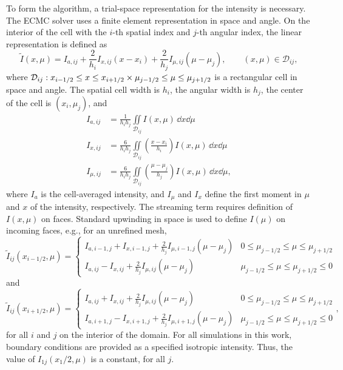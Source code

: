 To form the algorithm, a trial-space representation for the intensity is necessary.  The ECMC solver uses a finite element representation in space and angle. On the
interior of the cell with the $i$-th spatial index and $j$-th angular index, the linear representation is defined as
\begin{equation}\label{eq:ld_intens}
    \tilde I(x,\mu) = I_{a,ij} + \frac{2}{h_i}I_{x,ij}\left(x-x_i\right) +
    \frac{2}{h_j}I_{\mu,ij}\left(\mu-\mu_j\right), \quad \quad (x,\mu) \in
    \mathcal{D}_{ij},
\end{equation}
where $\mathcal{D}_{ij}: x_{{i-1/2}} \leq  x \leq  x_{{i+1/2}} \times \mu_{j-1/2} \leq \mu \leq \mu_{j+1/2}$
is a rectangular cell in space and angle.
The spatial cell width is $h_i$, the angular width is
$h_j$, the center of the cell is $(x_i,\mu_j)$, and
\begin{align}\label{eq:Imoms}
    I_{a,ij} &= \frac{1}{h_i h_j} \iint\limits_{\mathcal{D}_{ij}} I(x,\mu)\, \dd x \dd \mu \\
    I_{x,ij} &= \frac{6}{h_ih_j}\iint\limits_{\mathcal{D}_{ij}} \left(\frac{x - x_i}{h_{i}}\right)
    I(x,\mu)\, \dd x \dd \mu \\ \label{eq:Imoms2}
    I_{\mu,ij} &= \frac{6}{h_ih_j}\iint\limits_{\mathcal{D}_{ij}}
    \left(\frac{\mu - \mu_j}{h_{j}}\right)
    I(x,\mu)\, \dd x \dd \mu,
\end{align} 
where $I_a$ is the cell-averaged intensity, and $I_\mu$ and $I_x$ define the first
moment in $\mu$ and $x$ of the intensity, respectively.  The streaming term requires
definition of $I(x,\mu)$ on faces.  Standard upwinding in space is
used to define $I(\mu)$ on incoming faces, e.g., for an unrefined mesh,
\begin{equation}\label{eq:left_uw}
    \tilde{I}_{ij}(x_{i-1/2},\mu) = \left \{ \begin{array}{cl}
        I_{a,i-1,j}+I_{x,i-1,j}+\frac{2}{h_j}I_{\mu,i-1,j}\left(\mu-\mu_j\right) & 0 \leq \mu_{j-1/2} \leq \mu \leq \mu_{j+1/2} \\ 
I_{a,ij}-I_{x,ij}+\frac{2}{h_j}I_{\mu,ij}\left(\mu-\mu_j\right) &   \mu_{j-1/2} \leq \mu \leq \mu_{j+1/2} \leq 0
\end{array} \right.
\end{equation}
and
\begin{equation}\label{eq:right_uw}
    \tilde{I}_{ij}(x_{i+1/2},\mu) = \left \{ \begin{array}{cl}
I_{a,ij}+I_{x,ij}+\frac{2}{h_j}I_{\mu,ij}\left(\mu-\mu_j\right)
         & 0 \leq \mu_{j-1/2} \leq \mu \leq \mu_{j+1/2} \\ 
I_{a,i+1,j}-I_{x,i+1,j}+\frac{2}{h_j}I_{\mu,i+1,j}\left(\mu-\mu_j\right)
&   \mu_{j-1/2} \leq \mu \leq \mu_{j+1/2} \leq 0
\end{array} \right. ,
\end{equation}
for all $i$ and $j$ on the interior of the domain.  For all simulations in this work,
boundary conditions are provided as a specified isotropic intensity. Thus, the value of
$I_{1j}(x_1/2,\mu)$ is a constant, for all $j$.

